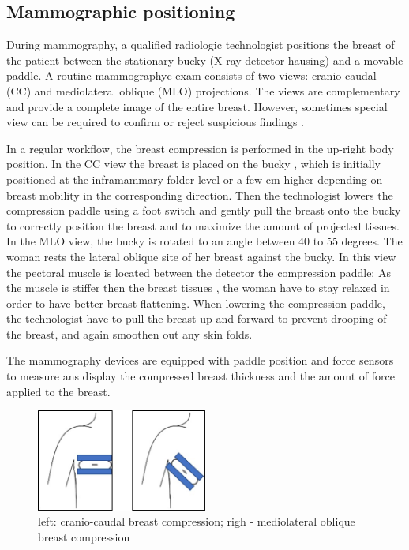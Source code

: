 \subsection{Mammographic positioning} \label{subsec:mammographicpositioning}

During mammography, a qualified radiologic technologist positions the breast of the patient between the stationary bucky (X-ray detector hausing) and a movable paddle. A routine mammographyc exam consists of two views: cranio-caudal (CC) and mediolateral oblique (MLO) projections. The views are complementary and provide a complete image of the entire breast. However, sometimes special view can be required  to confirm or reject suspicious findings \citep{groot_towards_2015}. 

In a regular workflow, the breast compression is performed in the up-right body position. In the CC view the breast is placed on the bucky , which is initially positioned at the inframammary folder level or a few cm higher depending on breast mobility in the corresponding direction. Then the technologist lowers the compression paddle using a foot switch and gently pull the breast onto the bucky to correctly position the breast and to maximize the amount of projected tissues. In the MLO view, the bucky is rotated to an angle between 40 to 55 degrees. The woman rests the lateral oblique site of her breast against the bucky. In this view the pectoral muscle is located between the detector the compression paddle; As the muscle is stiffer then the breast tissues , the woman have to stay relaxed in order to have better breast flattening. When lowering the compression paddle, the technologist have to pull the breast up and forward to prevent drooping of the breast, and again smoothen out any skin folds.

The mammography devices are equipped with paddle position and force sensors to measure ans display the compressed breast thickness and the amount of force applied to the breast.


\begin{figure}[!h]
\centering
\includegraphics[width=0.5\textwidth,keepaspectratio]{figures/cc_mlo_view.jpg} 
\caption{left: cranio-caudal breast compression; righ - mediolateral oblique breast compression }\label{fig:cc_mlo_view}
\end{figure}


